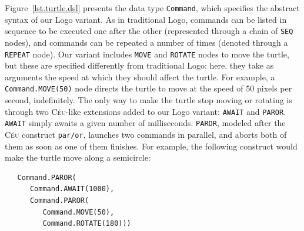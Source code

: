 \documentclass{acm_proc_article-sp}
\newcommand{\CEU}{\textsc{C\'{e}u}\xspace}
\newcommand{\code}[1] {{\small{\texttt{#1}}}}
\begin{document}
Figure~\ref{lst.turtle.dsl} presents the data type \code{Command}, which
specifies the abstract syntax of our Logo variant. As in traditional Logo,
commands can be listed in sequence to be executed one after the other
(represented through a chain of \code{SEQ} nodes), and commands can be
repeated a number of times (denoted through a \code{REPEAT} node). Our variant
includes \code{MOVE} and \code{ROTATE} nodes to move the turtle, but these are
specified differently from traditional Logo: here, they take as arguments the
speed at which they should affect the turtle. For example, a
\code{Command.MOVE(50)} node directs the turtle to move at the speed of 50
pixels per second, indefinitely. The only way to make the turtle stop moving
or rotating is through two \CEU-like extensions added to our Logo variant:
\code{AWAIT} and \code{PAROR}. \code{AWAIT} simply awaits a given number of
milliseconds. \code{PAROR}, modeled after the \CEU construct \code{par/or},
launches two commands in parallel, and aborts both of them as soon as one of
them finishes. For example, the following construct would make the turtle move
along a semicircle:

\begin{verbatim}
   Command.PAROR(
      Command.AWAIT(1000),
      Command.PAROR(
         Command.MOVE(50),
         Command.ROTATE(180)))
\end{verbatim}

\end{document}
